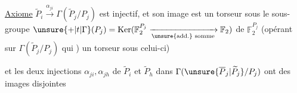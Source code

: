 \uline{Axiome} \(\widetilde P_i\xrightarrow{\alpha_{ji}}\Gamma(\widetilde P_j/P_j)\) est injectif, et  son image est un torseur sous le sous-groupe \(\unsure{+|t|\Gamma}(P_j)=\operatorname{Ker}(\mathbb F_2^{P_j}\xrightarrow[\text{\unsure{add.} somme}]{}\mathbb F_2)\) de \(\mathbb F_2^{P_j}\) (opérant sur \(\Gamma(\widetilde P_j/P_j)\) qui ) un torseur  sous celui-ci)

et les deux injections \(\alpha_{ji},\alpha_{jh}\)  de \(\widetilde P_i\) et \(\widetilde P_h\) dans \(\Gamma(\unsure{\overline P_j|\widetilde P_j}/P_j)\) ont des images disjointes
